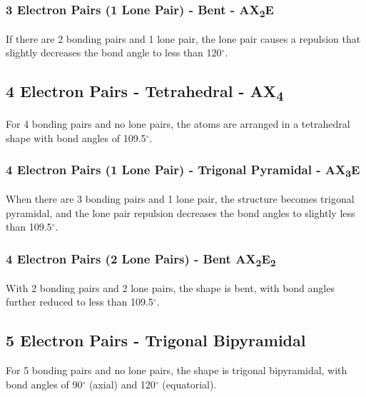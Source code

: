 \documentclass{report}
\begin{document}
\subsubsection{3 Electron Pairs (1 Lone Pair) - Bent - AX\textsubscript{2}E}
If there are 2 bonding pairs and 1 lone pair, the lone pair causes a repulsion that slightly decreases the bond angle to less than 120$^\circ$.
\begin{center}
\end{center}

\subsection{4 Electron Pairs - Tetrahedral - AX\textsubscript{4}}
For 4 bonding pairs and no lone pairs, the atoms are arranged in a tetrahedral shape with bond angles of 109.5$^\circ$.
\begin{center}
\end{center}

\subsubsection{4 Electron Pairs (1 Lone Pair) - Trigonal Pyramidal - AX\textsubscript{3}E}
When there are 3 bonding pairs and 1 lone pair, the structure becomes trigonal pyramidal, and the lone pair repulsion decreases the bond angles to slightly less than 109.5$^\circ$.
\begin{center}
\end{center}

\subsubsection{4 Electron Pairs (2 Lone Pairs) - Bent AX\textsubscript{2}E\textsubscript{2}}
With 2 bonding pairs and 2 lone pairs, the shape is bent, with bond angles further reduced to less than 109.5$^\circ$.
\begin{center}
\end{center}

\subsection{5 Electron Pairs - Trigonal Bipyramidal}
For 5 bonding pairs and no lone pairs, the shape is trigonal bipyramidal, with bond angles of 90$^\circ$ (axial) and 120$^\circ$ (equatorial).
\begin{center}
\end{center}
\end{document}
